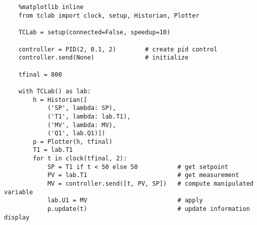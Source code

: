 \begin{verbatim}


    %matplotlib inline
    from tclab import clock, setup, Historian, Plotter
    
    TCLab = setup(connected=False, speedup=10)
    
    controller = PID(2, 0.1, 2)        # create pid control
    controller.send(None)              # initialize
    
    tfinal = 800
    
    with TCLab() as lab:
        h = Historian([
            ('SP', lambda: SP), 
            ('T1', lambda: lab.T1), 
            ('MV', lambda: MV), 
            ('Q1', lab.Q1)])
        p = Plotter(h, tfinal)
        T1 = lab.T1
        for t in clock(tfinal, 2):
            SP = T1 if t < 50 else 50           # get setpoint
            PV = lab.T1                         # get measurement
            MV = controller.send([t, PV, SP])   # compute manipulated variable
            lab.U1 = MV                         # apply 
            p.update(t)                         # update information display
    \end{verbatim}











\setcounter{equation}{0}
\setcounter{table}{0}
\setcounter{figure}{0}


    



